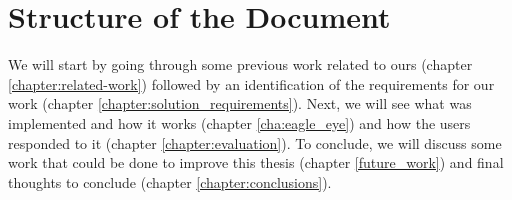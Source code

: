 


\section{Structure of the Document} %
\label{ssub:structure_of_the_document}

We will start by going through some previous work related to ours (chapter \ref{chapter:related-work}) followed by an identification of the requirements for our work (chapter \ref{chapter:solution_requirements}). Next, we will see what was implemented and how it works (chapter \ref{cha:eagle_eye}) and how the users responded to it (chapter \ref{chapter:evaluation}). To conclude, we will discuss some work that could be done to improve this thesis (chapter \ref{future_work}) and final thoughts to conclude (chapter \ref{chapter:conclusions}).


